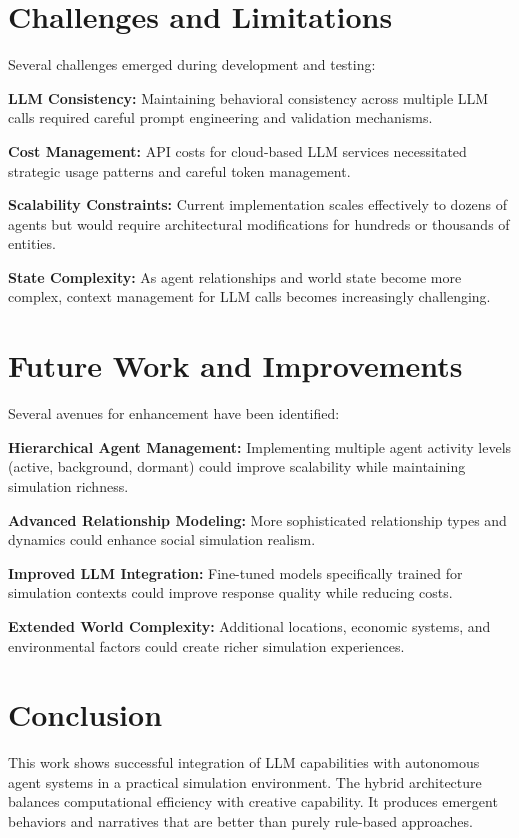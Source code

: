 \documentclass[conference]{IEEEtran}
\begin{document}
\section{Challenges and Limitations}

Several challenges emerged during development and testing:

\textbf{LLM Consistency:} Maintaining behavioral consistency across multiple LLM calls required careful prompt engineering and validation mechanisms.

\textbf{Cost Management:} API costs for cloud-based LLM services necessitated strategic usage patterns and careful token management.

\textbf{Scalability Constraints:} Current implementation scales effectively to dozens of agents but would require architectural modifications for hundreds or thousands of entities.

\textbf{State Complexity:} As agent relationships and world state become more complex, context management for LLM calls becomes increasingly challenging.

\section{Future Work and Improvements}

Several avenues for enhancement have been identified:

\textbf{Hierarchical Agent Management:} Implementing multiple agent activity levels (active, background, dormant) could improve scalability while maintaining simulation richness.

\textbf{Advanced Relationship Modeling:} More sophisticated relationship types and dynamics could enhance social simulation realism.

\textbf{Improved LLM Integration:} Fine-tuned models specifically trained for simulation contexts could improve response quality while reducing costs.

\textbf{Extended World Complexity:} Additional locations, economic systems, and environmental factors could create richer simulation experiences.

\section{Conclusion}

This work shows successful integration of LLM capabilities with autonomous agent systems in a practical simulation environment. The hybrid architecture balances computational efficiency with creative capability. It produces emergent behaviors and narratives that are better than purely rule-based approaches.
\end{document}
